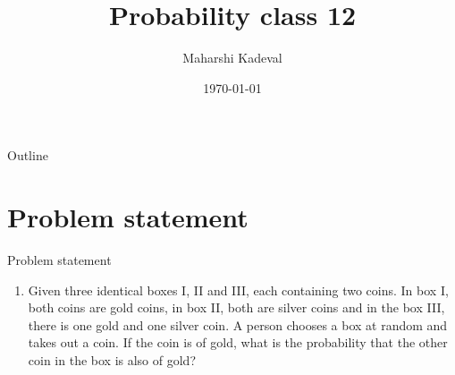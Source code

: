 \documentclass{beamer}
\title{Probability class 12}
\author{Maharshi Kadeval}
\date{\today}
\begin{document}
\begin{frame}
    \titlepage 
\end{frame}

\logo{}


\begin{frame}{Outline}
    \tableofcontents
\end{frame}


\section{Problem statement}
\begin{frame}{Problem statement}
\begin{enumerate}
\item Given three identical boxes I, II and III, each containing two coins. In
box I, both coins are gold coins, in box II, both are silver coins and in the box III, there
is one gold and one silver coin. A person chooses a box at random and takes out a coin.
If the coin is of gold, what is the probability that the other coin in the box is also of gold?\\
\end{enumerate}

\end{frame}


\end{document}
